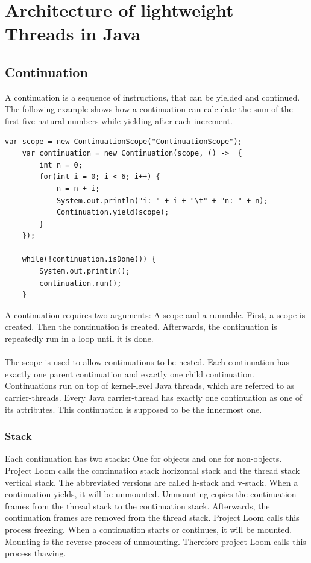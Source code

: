 \chapter{Architecture of lightweight Threads in Java}

\section{Continuation}

A continuation is a sequence of instructions, that can be yielded and continued. The following example shows how a continuation can calculate the sum of the first five natural numbers while yielding after each increment.

\begin{lstlisting}[language=custom-java]
    var scope = new ContinuationScope("ContinuationScope");
    var continuation = new Continuation(scope, () ->  {
        int n = 0;
        for(int i = 0; i < 6; i++) {
            n = n + i;
            System.out.println("i: " + i + "\t" + "n: " + n);
            Continuation.yield(scope);
        }
    });

    while(!continuation.isDone()) {
        System.out.println();
        continuation.run();
    }
\end{lstlisting}

A continuation requires two arguments: A scope and a runnable. First, a scope is created. Then the continuation is created. Afterwards, the continuation is repeatedly run in a loop until it is done.
\\
\\
The scope is used to allow continuations to be nested. Each continuation has exactly one parent continuation and exactly one child continuation. Continuations run on top of kernel-level Java threads, which are referred to as carrier-threads. Every Java carrier-thread has exactly one continuation as one of its attributes. This continuation is supposed to be the innermost one.

\subsection{Stack}
Each continuation has two stacks: One for objects and one for non-objects. Project Loom calls the continuation stack horizontal stack and the thread stack vertical stack. The abbreviated versions are called h-stack and v-stack.
When a continuation yields, it will be unmounted. Unmounting copies the continuation frames from the thread stack to the continuation stack. Afterwards, the continuation frames are removed from the thread stack. Project Loom calls this process freezing.
When a continuation starts or continues, it will be mounted. Mounting is the reverse process of unmounting. Therefore project Loom calls this process thawing. \cite{OpenJDK:wiki}


